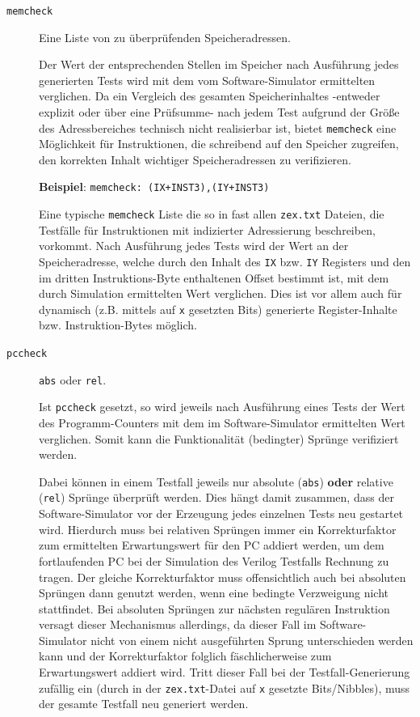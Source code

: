 \documentclass[ngerman, cd=lightcolor]{tudscrreprt}
\begin{document}
\begin{description}
\item[\texttt{memcheck}] Eine Liste von zu überprüfenden Speicheradressen.

Der Wert der entsprechenden Stellen im Speicher nach Ausführung jedes
generierten Tests wird mit dem vom Software-Simulator ermittelten verglichen.
Da ein Vergleich des gesamten Speicherinhaltes -entweder explizit oder über
eine Prüfsumme- nach jedem Test aufgrund der Größe des
Adressbereiches technisch nicht realisierbar ist, bietet \texttt{memcheck} eine
Möglichkeit für Instruktionen, die schreibend auf den Speicher zugreifen, den
korrekten Inhalt wichtiger Speicheradressen zu verifizieren.

\textbf{Beispiel}: \texttt{memcheck: (IX+INST3),(IY+INST3)}

Eine typische \texttt{memcheck} Liste die so in fast allen \texttt{zex.txt}
Dateien, die Testfälle für Instruktionen mit indizierter Adressierung
beschreiben, vorkommt. Nach Ausführung jedes Tests wird der Wert an der
Speicheradresse, welche durch den Inhalt des \texttt{IX} bzw. \texttt{IY}
Registers und den im dritten Instruktions-Byte enthaltenen Offset bestimmt ist,
mit dem durch Simulation ermittelten Wert verglichen. Dies ist vor
allem auch für dynamisch (z.B. mittels auf \texttt{x} gesetzten Bits)
generierte Register-Inhalte bzw. Instruktion-Bytes möglich.

\item[\texttt{pccheck}] \texttt{abs} oder \texttt{rel}.

Ist \texttt{pccheck} gesetzt, so wird jeweils nach Ausführung eines Tests der
Wert des Programm-Counters mit dem im Software-Simulator ermittelten Wert
verglichen. Somit kann die Funktionalität (bedingter) Sprünge verifiziert
werden.

Dabei können in einem Testfall jeweils nur absolute (\texttt{abs})
\textbf{oder} relative (\texttt{rel}) Sprünge überprüft werden. Dies hängt
damit zusammen, dass der Software-Simulator vor der Erzeugung jedes einzelnen
Tests neu gestartet wird. Hierdurch muss bei relativen Sprüngen immer ein
Korrekturfaktor zum ermittelten Erwartungswert für den PC addiert werden, um
dem fortlaufenden PC bei der Simulation des Verilog Testfalls Rechnung zu
tragen. Der gleiche Korrekturfaktor muss offensichtlich auch bei absoluten
Sprüngen dann genutzt werden, wenn eine bedingte Verzweigung nicht stattfindet.
Bei absoluten Sprüngen zur nächsten regulären Instruktion versagt dieser
Mechanismus allerdings, da dieser Fall im Software-Simulator nicht von einem
nicht ausgeführten Sprung unterschieden werden kann und der Korrekturfaktor
folglich fäschlicherweise zum Erwartungswert addiert wird. Tritt dieser Fall
bei der Testfall-Generierung zufällig ein (durch in der \texttt{zex.txt}-Datei
auf \texttt{x} gesetzte Bits/Nibbles), muss der gesamte Testfall neu generiert
werden.


\end{description}
\end{document}
